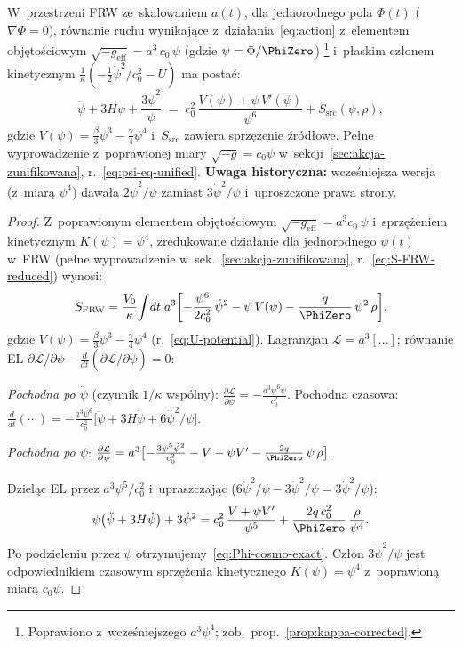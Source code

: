 \begin{proposition}%
\label{prop:FRW-derivation}
W~przestrzeni FRW ze~skalowaniem $a(t)$, dla jednorodnego pola
$\Phi(t)$ ($\nabla\Phi = 0$), r\'ownanie ruchu wynikaj\k{a}ce
z~dzia\l{}ania~\eqref{eq:action} z~elementem obj\k{e}to\'sciowym
$\sqrt{-g_{\mathrm{eff}}} = a^3\,c_0\,\psi$ (gdzie $\psi = \Phi/\PhiZero$)%
\footnote{Poprawiono z~wcze\'sniejszego $a^3\psi^4$;
  zob.\ prop.~\ref{prop:kappa-corrected}.}
i~p\l{}askim cz\l{}onem kinetycznym $\frac{1}{\kappa}(-\frac{1}{2}\dot\psi^2/c_0^2 - U)$
ma posta\'c:
\begin{equation}\label{eq:Phi-cosmo-exact}
  \boxed{
    \ddot\psi + 3H\dot\psi + \frac{3\dot\psi^2}{\psi}
    \;=\; c_0^2\,\frac{V(\psi) + \psi\,V'(\psi)}{\psi^6}
    + S_{\mathrm{src}}(\psi,\rho),
  }
\end{equation}
gdzie $V(\psi) = \frac{\beta}{3}\psi^3 - \frac{\gamma}{4}\psi^4$
i~$S_{\mathrm{src}}$ zawiera sprz\k{e}\.zenie \'zr\'od\l{}owe.
Pe\l{}ne wyprowadzenie z~poprawionej miary $\sqrt{-g}=c_0\psi$
w~sekcji~\ref{sec:akcja-zunifikowana},
r.~\eqref{eq:psi-eq-unified}.
\textbf{Uwaga historyczna:} wcze\'sniejsza wersja
(z~miar\k{a} $\psi^4$) dawa\l{}a
$2\dot\psi^2/\psi$ zamiast $3\dot\psi^2/\psi$
i~uproszczone prawa strony.
\end{proposition}

\begin{proof}
Z~poprawionym elementem obj\k{e}to\'sciowym
$\sqrt{-g_{\mathrm{eff}}} = a^3 c_0\,\psi$
i~sprz\k{e}\.zeniem kinetycznym $K(\psi) = \psi^4$,
zredukowane dzia\l{}anie dla jednorodnego $\psi(t)$ w~FRW
(pe\l{}ne wyprowadzenie w~sek.~\ref{sec:akcja-zunifikowana},
r.~\eqref{eq:S-FRW-reduced}) wynosi:
\[
  S_{\mathrm{FRW}} = \frac{V_0}{\kappa}\!\int\!dt\;a^3\biggl[
    -\frac{\psi^6}{2c_0^2}\,\dot\psi^2
    - \psi\,V(\psi)
    - \frac{q}{\PhiZero}\,\psi^2\,\rho
  \biggr],
\]
gdzie $V(\psi) = \frac{\beta}{3}\psi^3 - \frac{\gamma}{4}\psi^4$
(r.~\eqref{eq:U-potential}).
Lagran\.zjan $\mathcal{L} = a^3[\ldots]$; r\'ownanie EL
$\partial\mathcal{L}/\partial\psi
- \frac{d}{dt}(\partial\mathcal{L}/\partial\dot\psi) = 0$:

\emph{Pochodna po $\dot\psi$}
(czynnik $1/\kappa$ wsp\'olny):
$\frac{\partial\mathcal{L}}{\partial\dot\psi}
= -\frac{a^3\psi^6\dot\psi}{c_0^2}$.
Pochodna czasowa:
$\frac{d}{dt}(\cdots)
= -\frac{a^3\psi^6}{c_0^2}
\bigl[\ddot\psi + 3H\dot\psi + 6\dot\psi^2/\psi\bigr]$.

\emph{Pochodna po $\psi$}:
$\frac{\partial\mathcal{L}}{\partial\psi}
= a^3\bigl[
  -\frac{3\psi^5\dot\psi^2}{c_0^2}
  - V - \psi V'
  - \frac{2q}{\PhiZero}\,\psi\,\rho
\bigr]$.

Dziel\k{a}c EL przez $a^3\psi^5/c_0^2$ i~upraszczaj\k{a}c
($6\dot\psi^2/\psi - 3\dot\psi^2/\psi = 3\dot\psi^2/\psi$):
\[
  \psi\bigl(\ddot\psi + 3H\dot\psi\bigr) + 3\dot\psi^2
  = c_0^2\,\frac{V + \psi V'}{\psi^5}
  + \frac{2q\,c_0^2}{\PhiZero}\,\frac{\rho}{\psi^4}.
\]
Po podzieleniu przez $\psi$
otrzymujemy~\eqref{eq:Phi-cosmo-exact}.
Cz\l{}on $3\dot\psi^2/\psi$ jest odpowiednikiem
czasowym sprz\k{e}\.zenia kinetycznego $K(\psi)=\psi^4$
z~poprawion\k{a} miar\k{a} $c_0\psi$.
\end{proof}

